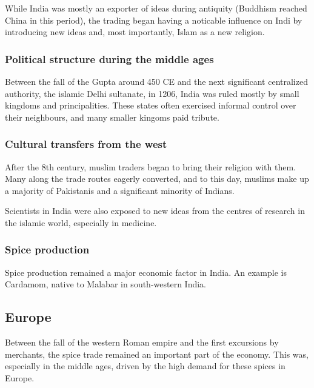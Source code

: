 \documentclass[11pt, a4paper, headings=standardclasses]{scrartcl}
\begin{document}
While India was mostly an exporter of ideas during antiquity (Buddhism reached China in this period\autocite{SilkRoadIslam}), the trading began having a noticable influence on Indi by introducing new ideas and, most importantly, Islam as a new religion.

\subsubsection{Political structure during the middle ages}

Between the fall of the Gupta around 450 CE\autocite[Section \textit{Gupta}]{India} and the next significant centralized authority, the islamic Delhi sultanate, in 1206\autocite{Delhi}, India was ruled mostly by small kingdoms and principalities. These states often exercised informal control over their neighbours, and many smaller kingoms paid tribute.\autocite{India}

\subsubsection{Cultural transfers from the west}

After the 8th century, muslim traders began to bring their religion with them.\autocite{SilkRoadIslam} Many along the trade routes eagerly converted, and to this day, muslims make up a majority of Pakistanis and a significant minority of Indians.\autocite{India}

Scientists in India were also exposed to new ideas from the centres of research in the islamic world, especially in medicine.\autocite{SilkRoadIslam}

\subsubsection{Spice production}

Spice production remained a major economic factor in India. An example is Cardamom, native to Malabar in south-western India.\autocite[71]{Rome}

\subsection{Europe}

Between the fall of the western Roman empire and the first excursions by merchants, the spice trade remained an important part of the economy.\autocite{Yale} This was, especially in the middle ages, driven by the high demand for these spices in Europe. 
\end{document}

